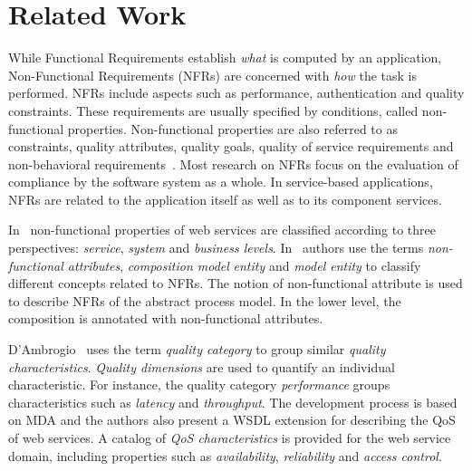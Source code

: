 \documentclass{singlecol-new}
\theoremstyle{TH}{
\newtheorem{lemma}{Lemma}
\newtheorem{theorem}[lemma]{Theorem}
\newtheorem{corrolary}[lemma]{Corrolary}
\newtheorem{conjecture}[lemma]{Conjecture}
\newtheorem{proposition}[lemma]{Proposition}
\newtheorem{claim}[lemma]{Claim}
\newtheorem{stheorem}[lemma]{Wrong Theorem}
\newtheorem{algorithm}{Algorithm}
}
\theoremstyle{THrm}{
\newtheorem{definition}{Definition}[section]
\newtheorem{question}{Question}[section]
\newtheorem{remark}{Remark}
\newtheorem{scheme}{Scheme}
}
\theoremstyle{THhit}{
\newtheorem{case}{Case}[section]
}
\theoremstyle{THhsl}{
\newtheorem{example}{Example}
}
\begin{document}
\section{Related Work}
\label{sec:relworks}
While Functional Requirements establish \textit{what} is computed by an application, Non-Functional Requirements (NFRs) are concerned with \textit{how} the task is performed.
NFRs include aspects such as performance, authentication and quality constraints.
These requirements are usually specified by conditions, called non-functional properties.
Non-functional properties are also referred to as constraints, quality attributes, quality goals, quality of service requirements and non-behavioral requirements~\cite{Chung91,MylopoulosBook99,Chung2009}.
%
Most research  on NFRs focus on the evaluation of compliance by the software system as a whole. %
In service-based applications, NFRs are related to the application itself as well as to  its component services.

In~\cite{Babamir2010,Yeom2006} non-functional properties of web services are classified according to three perspectives:
\textit{service}, \textit{system} and \textit{business levels}.
In~\cite{XiaoCZBOLH08}  authors use the terms
\textit{non-functional attributes}, \textit{composition mo\-del}  \textit{entity} and \textit{mo\-del entity}  to classify different concepts related to NFRs.
The notion of non-functional attribute is used to describe NFRs of the abstract process model.
In the lower level, the composition is annotated with non-functional attributes.

D'Ambrogio~\cite{DAmbrogio06} uses the term \textit{quality category} to group similar \textit{quality characteristics}.
\textit{Quality dimensions} are used to quantify an individual characteristic.
For instance, the quality category \textit{performance} groups characteristics such as
\textit{latency} and \textit{throughput}.
The development process is based on MDA and the authors also present a WSDL extension for describing the QoS of web services. A catalog of \textit{QoS characteristics} is provided for the web service domain, including properties such as \textit{availability}, \textit{reliability} and \textit{access control}.
\end{document}
